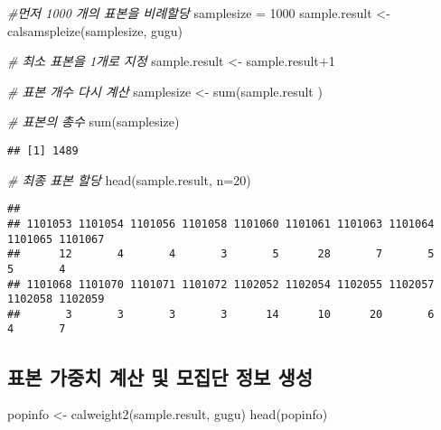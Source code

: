 \documentclass[
]{book}
\newenvironment{Shaded}{\begin{snugshade}}{\end{snugshade}}
\newcommand{\AttributeTok}[1]{\textcolor[rgb]{0.77,0.63,0.00}{#1}}
\newcommand{\CommentTok}[1]{\textcolor[rgb]{0.56,0.35,0.01}{\textit{#1}}}
\newcommand{\DecValTok}[1]{\textcolor[rgb]{0.00,0.00,0.81}{#1}}
\newcommand{\FunctionTok}[1]{\textcolor[rgb]{0.00,0.00,0.00}{#1}}
\newcommand{\NormalTok}[1]{#1}
\newcommand{\OtherTok}[1]{\textcolor[rgb]{0.56,0.35,0.01}{#1}}
\newcommand{\SpecialCharTok}[1]{\textcolor[rgb]{0.00,0.00,0.00}{#1}}
\begin{document}
\begin{Shaded}
\begin{Highlighting}[]
\CommentTok{\#먼저 1000 개의 표본을 비례할당}
\NormalTok{samplesize }\OtherTok{=} \DecValTok{1000} 
\NormalTok{sample.result }\OtherTok{\textless{}{-}} \FunctionTok{calsamspleize}\NormalTok{(samplesize, gugu)}

\CommentTok{\# 최소 표본을 1개로 지정 }
\NormalTok{sample.result }\OtherTok{\textless{}{-}}\NormalTok{ sample.result}\SpecialCharTok{+}\DecValTok{1}

\CommentTok{\# 표본 개수 다시 계산 }
\NormalTok{samplesize }\OtherTok{\textless{}{-}} \FunctionTok{sum}\NormalTok{(sample.result )}

\CommentTok{\# 표본의 총수}
\FunctionTok{sum}\NormalTok{(samplesize)}
\end{Highlighting}
\end{Shaded}

\begin{verbatim}
## [1] 1489
\end{verbatim}

\begin{Shaded}
\begin{Highlighting}[]
\CommentTok{\# 최종 표본 할당}
\FunctionTok{head}\NormalTok{(sample.result, }\AttributeTok{n=}\DecValTok{20}\NormalTok{)}
\end{Highlighting}
\end{Shaded}

\begin{verbatim}
## 
## 1101053 1101054 1101056 1101058 1101060 1101061 1101063 1101064 1101065 1101067 
##      12       4       4       3       5      28       7       5       5       4 
## 1101068 1101070 1101071 1101072 1102052 1102054 1102055 1102057 1102058 1102059 
##       3       3       3       3      14      10      20       6       4       7
\end{verbatim}

\hypertarget{uxd45cuxbcf8-uxac00uxc911uxce58-uxacc4uxc0b0-uxbc0f-uxbaa8uxc9d1uxb2e8-uxc815uxbcf4-uxc0dduxc131}{%
\subsection{표본 가중치 계산 및 모집단 정보 생성}\label{uxd45cuxbcf8-uxac00uxc911uxce58-uxacc4uxc0b0-uxbc0f-uxbaa8uxc9d1uxb2e8-uxc815uxbcf4-uxc0dduxc131}}

\begin{Shaded}
\begin{Highlighting}[]
\NormalTok{popinfo }\OtherTok{\textless{}{-}} \FunctionTok{calweight2}\NormalTok{(sample.result, gugu)}
\FunctionTok{head}\NormalTok{(popinfo)}
\end{Highlighting}
\end{Shaded}
\end{document}
